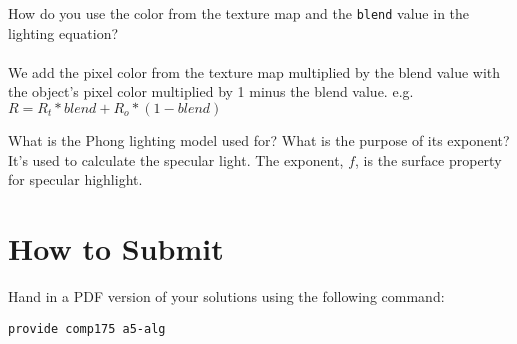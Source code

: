 \documentclass[10pt,twocolumn]{article}
\begin{document}
\begin{framed}
\noindent{\bf[1 point]} How do you use the color from the texture map and the {\tt blend} value in the lighting equation?\\\\
We add the pixel color from the texture map multiplied by the blend value with the object's pixel color multiplied by 1 minus the blend value. e.g. $R = R_t * blend + R_o * (1 - blend)$

\end{framed}

\begin{framed}
\noindent{\bf[1 point]}  What is the Phong lighting model used for? What is the purpose of its exponent?
It's used to calculate the specular light. The exponent, $f$, is the surface property for specular highlight.
\end{framed}

\section{How to Submit}

Hand in a PDF version of your solutions using the following command:
\begin{center}
 {\tt provide comp175 a5-alg}
 \end{center}
\end{document}
